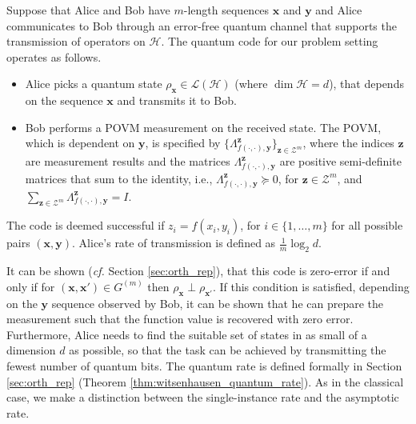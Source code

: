 \documentclass[journal, onecolumn, draftcls]{IEEEtran}
\theoremstyle{definition}
\newcommand{\calH}{\mathcal{H}}
\newcommand{\calL}{\mathcal{L}}
\newcommand{\calZ}{\mathcal{Z}}
\newcommand{\bfy}{\mathbf{y}}
\newcommand{\bfx}{\mathbf{x}}
\newcommand{\bfz}{\mathbf{z}}
\newcommand{\meng}[1]{\marginpar{+}{\bf Ruoyu's remark}: {\em #1}}
\begin{document}
Suppose that Alice and Bob have $m$-length sequences $\bfx$ and $\bfy$ and Alice communicates to Bob through an error-free quantum channel that supports the transmission of operators on $\calH$. The quantum code for our problem setting operates as follows.
\begin{itemize}[leftmargin=2mm]
    \item Alice picks a quantum state $\rho_\bfx \in \calL(\calH)$ (where $\dim \calH = d$), that depends on the sequence $\bfx$ and transmits it to Bob.  
    \item Bob performs a POVM measurement\cite[pg. 134]{wilde_17} on the received state. The POVM, which is dependent on $\bfy$, is specified by $\{\Lambda^\bfz_{f(\cdot,\cdot), \bfy}\}_{\bfz \in \calZ^m}$, where the indices $\bfz$ are measurement results and the matrices $\Lambda^\bfz_{f(\cdot,\cdot), \bfy}$ are positive semi-definite matrices that sum to the identity, i.e., $\Lambda^\bfz_{f(\cdot,\cdot), \bfy} \succeq 0$, for $\bfz \in \calZ^m$, and $\sum_{\bfz \in \calZ^m}  \Lambda^\bfz_{f(\cdot,\cdot), \bfy} = I$.
    


\end{itemize}
The code is deemed successful if $z_i = f(x_i, y_i)$, for $i \in \{ 1, \dots, m\}$ for all possible pairs $(\bfx, \bfy)$. %
 Alice's rate of transmission is defined as $\frac{1}{m} \log_2 d$.



It can be shown ({\it cf.} Section \ref{sec:orth_rep}), that this code is zero-error if and only if for $(\bfx, \bfx') \in G^{(m)}$ then $\rho_\bfx \perp \rho_{\bfx'}$. If this condition is satisfied, depending on the $\bfy$ sequence observed by Bob, it can be shown that he can prepare the measurement such that   the function value is recovered with zero error. Furthermore, Alice needs to find the suitable set of states in as small of a dimension $d$ as possible, so that the task can be achieved by transmitting the fewest number of quantum bits. The quantum rate is defined formally in Section \ref{sec:orth_rep} (Theorem \ref{thm:witsenhausen_quantum_rate}). As in the classical case, we make a distinction between the single-instance rate and the asymptotic rate.
\end{document}
